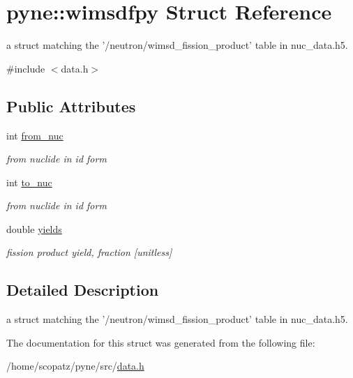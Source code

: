 \hypertarget{structpyne_1_1wimsdfpy}{\section{pyne\-:\-:wimsdfpy Struct Reference}
\label{structpyne_1_1wimsdfpy}
}


a struct matching the '/neutron/wimsd\-\_\-fission\-\_\-product' table in nuc\-\_\-data.\-h5.  




{\ttfamily \#include $<$data.\-h$>$}

\subsection*{Public Attributes}
\begin{DoxyCompactItemize}
\item 
\hypertarget{structpyne_1_1wimsdfpy_a7521e458719ebb8ed23f4912ec4555f8}{int \hyperlink{structpyne_1_1wimsdfpy_a7521e458719ebb8ed23f4912ec4555f8}{from\-\_\-nuc}}\label{structpyne_1_1wimsdfpy_a7521e458719ebb8ed23f4912ec4555f8}

\begin{DoxyCompactList}\small\item\em from nuclide in id form \end{DoxyCompactList}\item 
\hypertarget{structpyne_1_1wimsdfpy_a2a0f913a64fb76c5c82e1212df7fbb6c}{int \hyperlink{structpyne_1_1wimsdfpy_a2a0f913a64fb76c5c82e1212df7fbb6c}{to\-\_\-nuc}}\label{structpyne_1_1wimsdfpy_a2a0f913a64fb76c5c82e1212df7fbb6c}

\begin{DoxyCompactList}\small\item\em from nuclide in id form \end{DoxyCompactList}\item 
\hypertarget{structpyne_1_1wimsdfpy_a1c20eef7a02f2f62dba113cbf24d8bf2}{double \hyperlink{structpyne_1_1wimsdfpy_a1c20eef7a02f2f62dba113cbf24d8bf2}{yields}}\label{structpyne_1_1wimsdfpy_a1c20eef7a02f2f62dba113cbf24d8bf2}

\begin{DoxyCompactList}\small\item\em fission product yield, fraction \mbox{[}unitless\mbox{]} \end{DoxyCompactList}\end{DoxyCompactItemize}


\subsection{Detailed Description}
a struct matching the '/neutron/wimsd\-\_\-fission\-\_\-product' table in nuc\-\_\-data.\-h5. 

The documentation for this struct was generated from the following file\-:\begin{DoxyCompactItemize}
\item 
/home/scopatz/pyne/src/\hyperlink{data_8h}{data.\-h}\end{DoxyCompactItemize}
